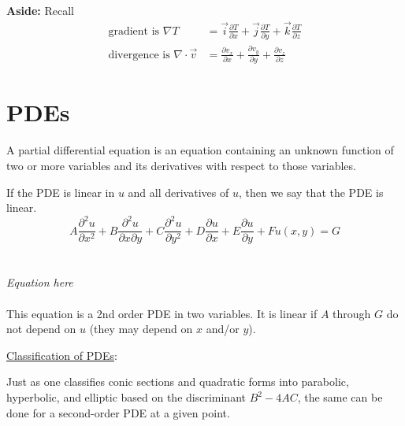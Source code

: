 \documentclass[12pt, answers]{exam}
\begin{document}
\textbf{Aside:} Recall
%
\begin{align}
\text{gradient is } \nabla T &= \vec{i}\frac{\partial T}{\partial x} + \vec{j}\frac{\partial T}{\partial y} + \vec{k}\frac{\partial T}{\partial z} \nonumber \\
%
\text{divergence is } \nabla \cdot \vec{v} &= \frac{\partial v_x}{\partial x} + \frac{\partial v_y}{\partial y} + \frac{\partial v_z}{\partial z} \nonumber
\end{align}

\section{PDEs}

A partial differential equation is an equation containing an unknown function of two or more variables and its derivatives with respect to those variables. 

If the PDE is linear in $u$ and all derivatives of $u$, then we say that the PDE is linear.
%
\ifprintanswers
\begin{equation}
A\frac{\partial^2 u}{\partial x^2} + B\frac{\partial^2 u}{\partial x \partial  y} + C\frac{\partial^2 u}{\partial y^2} + D\frac{\partial u}{\partial x} + E\frac{\partial u}{\partial y} + Fu(x,y) = G \nonumber
\end{equation}
\else
 \\ \\ \hspace*{8em}\textit{Equation here}\\ \\
\fi
%
This equation is a 2nd order PDE in two variables. It is linear if $A$ through $G$ do not depend on $u$ (they may depend on $x$ and/or $y$). 

\vspace*{1em}
\underline{Classification of PDEs}:%

Just as one classifies conic sections and quadratic forms into parabolic, hyperbolic, and elliptic based on the discriminant $B^2 - 4AC$, the same can be done for a second-order PDE at a given point. 
\end{document}
